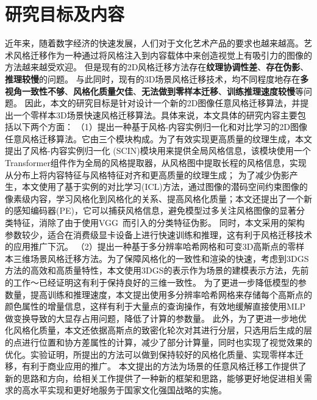 \section{研究目标及内容}
近年来，随着数字经济的快速发展，人们对于文化艺术产品的要求也越来越高。艺术风格迁移作为一种通过将风格注入到内容载体中来创造视觉上有吸引力的图像的方法越来越受欢迎。
但是现有的2D风格迁移方法存在\textbf{纹理协调性差}、\textbf{存在伪影}、\textbf{推理较慢}的问题。
与此同时，现有的3D场景风格迁移技术，均不同程度地存在\textbf{多视角一致性不够}、\textbf{风格化质量欠佳}、\textbf{无法做到零样本迁移}、\textbf{训练推理速度较慢}等问题。
因此，本文的研究目标是针对设计一个新的2D图像任意风格迁移算法，并提出一个零样本3D场景快速风格迁移算法。具体来说，本文具体的研究内容主要包括以下两个方面：
\newline \indent
（1）提出一种基于风格-内容实例归一化和对比学习的2D图像任意风格迁移算法。它由三个模块构成。为了有效实现更高质量的纹理生成，本文提出了风格-内容实例归一化 (SCIN)模块用来提供全局风格信息，该模块使用一个Transformer组件作为全局的风格提取器，从风格图中提取长程的风格信息，实现从分布上将内容特征与风格特征对齐和更高质量的纹理生成；
为了减少伪影产生，本文使用了基于实例的对比学习(ICL)方法，通过图像的潜码空间约束图像的像素级内容，学习风格化到风格化的关系、提高风格化质量；本文还提出了一个新的感知编码器(PE)，它可以捕获风格信息，避免模型过多关注风格图像的显著分类特征，消除了由于使用VGG~\cite{simonyan2015very}而引入的分类特征伪影。
同时，本文采用的架构参数较少，适合在消费级显卡设备上进行快速训练和推理，这有利于风格迁移技术的应用推广下沉。
\newline \indent
（2）提出一种基于多分辨率哈希网格和可变3D高斯点的零样本三维场景风格迁移方法。为了保障风格化的一致性和渲染的快速，考虑到3DGS方法的高效和高质量特性，本文使用3DGS的表示作为场景的建模表示方法，先前的工作～\cite{liu2024stylegaussian}已经证明这有利于保持良好的三维一致性。
为了更进一步降低模型的参数量，提高训练和推理速度，本文提出使用多分辨率哈希网格来存储每个高斯点的颜色属性的增量信息，这样有利于大量点的查询操作，有效地缓解直接使用MLP做变换导致的大显存占用问题，降低了计算的参数量。
此外，为了更进一步地优化风格化质量，本文还依据高斯点的致密化轮次对其进行分层，只选用后生成的层的点进行位置和协方差属性的计算，减少了部分计算量，同时也实现了视觉效果的优化。实验证明，所提出的方法可以做到保持较好的风格化质量、实现零样本迁移，有利于商业应用的推广。
\newline \indent	
本文提出的方法为场景的任意风格迁移工作提供了新的思路和方向，给相关工作提供了一种新的框架和思路，能够更好地促进相关需求的高水平实现和更好地服务于国家文化强国战略的实施。

